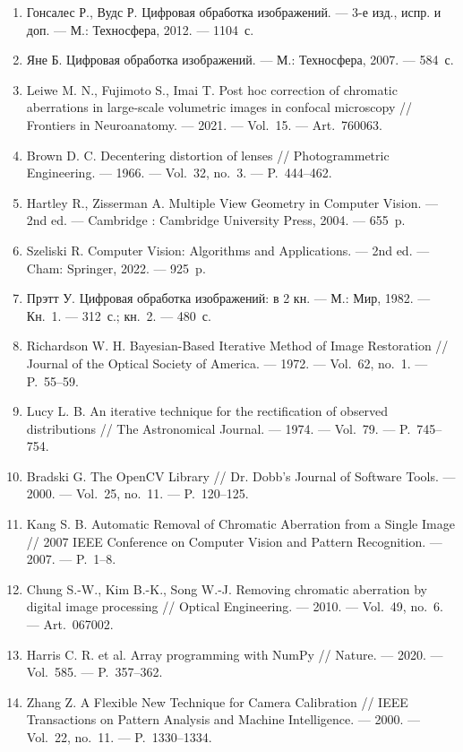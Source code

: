 \documentclass[a4paper,14pt,oneside]{extreport}
\begin{document}
\begin{enumerate}[label=\arabic*]
\item Гонсалес Р., Вудс Р. Цифровая обработка изображений. --- 3-е изд.,
испр. и доп. --- М.: Техносфера, 2012. --- 1104~с.

\item Яне Б. Цифровая обработка изображений. --- М.: Техносфера, 2007. ---
584~с.

\item Leiwe M. N., Fujimoto S., Imai T. Post hoc correction of chromatic
aberrations in large-scale volumetric images in confocal microscopy //
Frontiers in Neuroanatomy. --- 2021. --- Vol.~15. --- Art.~760063.

\item Brown D. C. Decentering distortion of lenses // Photogrammetric
Engineering. --- 1966. --- Vol.~32, no.~3. --- P.~444--462.

\item Hartley R., Zisserman A. Multiple View Geometry in Computer
Vision. --- 2nd ed. --- Cambridge : Cambridge University Press, 2004. ---
655~p.

\item Szeliski R. Computer Vision: Algorithms and Applications. ---
2nd ed. --- Cham: Springer, 2022. --- 925~p.

\item Прэтт У. Цифровая обработка изображений: в 2 кн. --- М.: Мир, 1982. ---
Кн.~1. --- 312~с.; кн.~2. --- 480~с.

\item Richardson W. H. Bayesian-Based Iterative Method of Image
Restoration // Journal of the Optical Society of America. --- 1972. ---
Vol.~62, no.~1. --- P.~55--59.

\item Lucy L. B. An iterative technique for the rectification of observed
distributions // The Astronomical Journal. --- 1974. --- Vol.~79. ---
P.~745--754.

\item Bradski G. The OpenCV Library // Dr. Dobb's Journal of Software
Tools. --- 2000. --- Vol.~25, no.~11. --- P.~120--125.

\item Kang S. B. Automatic Removal of Chromatic Aberration from a Single
Image // 2007 IEEE Conference on Computer Vision and Pattern Recognition. ---
2007. --- P.~1--8.

\item Chung S.-W., Kim B.-K., Song W.-J. Removing chromatic aberration by
digital image processing // Optical Engineering. --- 2010. --- Vol.~49,
no.~6. --- Art.~067002.

\item Harris C. R. et al. Array programming with NumPy // Nature. ---
2020. --- Vol.~585. --- P.~357--362.

\item Zhang Z. A Flexible New Technique for Camera Calibration //
IEEE Transactions on Pattern Analysis and Machine Intelligence. --- 2000. ---
Vol.~22, no.~11. --- P.~1330--1334.
\end{enumerate}
\end{document}
